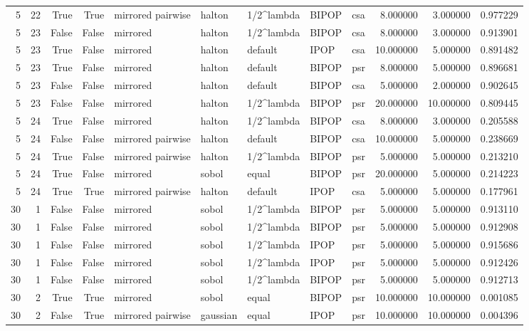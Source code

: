 \begin{tabular}{rrrrlllllrrr}
5 & 22 & True & True & mirrored pairwise & halton & 1/2^lambda & BIPOP & csa & 8.000000 & 3.000000 & 0.977229 \\
5 & 23 & False & False & mirrored & halton & 1/2^lambda & BIPOP & csa & 8.000000 & 3.000000 & 0.913901 \\
5 & 23 & True & False & mirrored & halton & default & IPOP & csa & 10.000000 & 5.000000 & 0.891482 \\
5 & 23 & True & False & mirrored & halton & default & BIPOP & psr & 8.000000 & 5.000000 & 0.896681 \\
5 & 23 & False & False & mirrored & halton & default & BIPOP & csa & 5.000000 & 2.000000 & 0.902645 \\
5 & 23 & False & False & mirrored & halton & 1/2^lambda & BIPOP & psr & 20.000000 & 10.000000 & 0.809445 \\
5 & 24 & True & False & mirrored & halton & 1/2^lambda & BIPOP & csa & 8.000000 & 3.000000 & 0.205588 \\
5 & 24 & False & False & mirrored pairwise & halton & default & BIPOP & csa & 10.000000 & 5.000000 & 0.238669 \\
5 & 24 & True & False & mirrored pairwise & halton & 1/2^lambda & BIPOP & psr & 5.000000 & 5.000000 & 0.213210 \\
5 & 24 & True & False & mirrored & sobol & equal & BIPOP & psr & 20.000000 & 5.000000 & 0.214223 \\
5 & 24 & True & True & mirrored pairwise & halton & default & IPOP & csa & 5.000000 & 5.000000 & 0.177961 \\
30 & 1 & False & False & mirrored & sobol & 1/2^lambda & BIPOP & psr & 5.000000 & 5.000000 & 0.913110 \\
30 & 1 & False & False & mirrored & sobol & 1/2^lambda & BIPOP & psr & 5.000000 & 5.000000 & 0.912908 \\
30 & 1 & False & False & mirrored & sobol & 1/2^lambda & IPOP & psr & 5.000000 & 5.000000 & 0.915686 \\
30 & 1 & False & False & mirrored & sobol & 1/2^lambda & IPOP & psr & 5.000000 & 5.000000 & 0.912426 \\
30 & 1 & False & False & mirrored & sobol & 1/2^lambda & BIPOP & psr & 5.000000 & 5.000000 & 0.912713 \\
30 & 2 & True & True & mirrored & sobol & equal & BIPOP & psr & 10.000000 & 10.000000 & 0.001085 \\
30 & 2 & False & True & mirrored pairwise & gaussian & equal & IPOP & psr & 10.000000 & 10.000000 & 0.004396 \\

\end{tabular}
